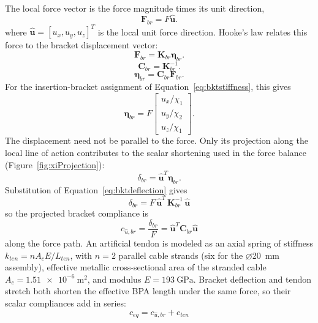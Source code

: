 \documentclass[utf8]{FrontiersinHarvard} %
\begin{document}
The local force vector is the force magnitude times its unit direction,
\begin{equation}
\mathbf{F}_{br}=F\hat{\mathbf{u}}.
\label{eq:bktforcevector}
\end{equation}
where $\hat{\mathbf{u}}=[u_x,u_y,u_z]^T$ is the local unit force direction.
Hooke's law relates this force to the bracket displacement vector:
\begin{equation}
\mathbf{F}_{br}=\mathbf{K}_{br}\boldsymbol{\eta}_{br}.
\label{eq:bktforcebalance}
\end{equation}
\begin{equation}
\mathbf{C}_{br}=\mathbf{K}_{br}^{-1}.
\label{eq:bktcompliance}
\end{equation}
\begin{equation}
\boldsymbol{\eta}_{br}=\mathbf{C}_{br}\mathbf{F}_{br}.
\label{eq:bktdeflection}
\end{equation}
For the insertion-bracket assignment of Equation~\eqref{eq:bktstiffness}, this gives
\begin{equation}
\boldsymbol{\eta}_{br}=F
\begin{bmatrix}u_x/\chi_1\\u_y/\chi_2\\u_z/\chi_1\end{bmatrix}.
\label{eq:bktcomponentdeflection}
\end{equation}
The displacement need not be parallel to the force. Only its projection along the local line of action contributes to the scalar shortening used in the force balance (Figure~\ref{fig:xiProjection}):
\begin{equation}
\delta_{br}=\hat{\mathbf{u}}^T\boldsymbol{\eta}_{br}.
\label{eq:bktprojecteddeflection}
\end{equation}
Substitution of Equation~\eqref{eq:bktdeflection} gives
\begin{equation}
\delta_{br} = F\, \hat{\mathbf{u}}^{T} \, \mathbf{K}_{br}^{-1} \, \hat{\mathbf{u}}
\label{eq:bktprojectedcompliance}
\end{equation}
so the projected bracket compliance is
\begin{equation}
c_{\hat{u},br} = \frac{\delta_{br}}{F} = \hat{\mathbf{u}}^{T} \mathbf{C}_{br} \hat{\mathbf{u}}
\label{eq:keff}
\end{equation}
along the force path. An artificial tendon is modeled as an axial spring of stiffness $k_{ten} = n A_{c} E / L_{ten}$, with $n = 2$ parallel cable strands (six for the $\diameter$\qty{20}{\mm} assembly), effective metallic cross-sectional area of the stranded cable $A_{c} = \qty{1.51e-6}{\metre\squared}$, and modulus $E = \qty{193}{\giga\pascal}$. Bracket deflection and tendon stretch both shorten the effective BPA length under the same force, so their scalar compliances add in series:
\begin{equation} c_{eq} = c_{\hat{u},br} + c_{ten}
\label{eq:equivalentstiffness}
\end{equation}
\end{document}
